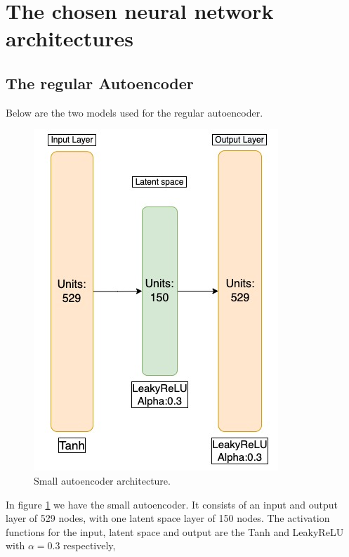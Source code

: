 \section{The chosen neural network architectures}

\subsection*{The regular Autoencoder}

Below are the two models used for the regular autoencoder. 
\begin{figure}[h!]
    \centering
    \includegraphics[scale=0.5]{Figures/nnarchitect/ae_small.jpeg}
    \caption{Small autoencoder architecture.}
    \label{fig:ae_small}
\end{figure}

In figure \ref{fig:ae_small} we have the small autoencoder. It consists of an input and output layer of 529 nodes, with 
one latent space layer of 150 nodes. The activation functions for the input, latent space and output are the Tanh and 
LeakyReLU with $\alpha=0.3$ respectively, 


